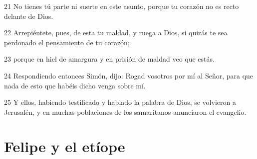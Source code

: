 \par 21 No tienes tú parte ni suerte en este asunto, porque tu corazón no es recto delante de Dios.
\par 22 Arrepiéntete, pues, de esta tu maldad, y ruega a Dios, si quizás te sea perdonado el pensamiento de tu corazón;
\par 23 porque en hiel de amargura y en prisión de maldad veo que estás.
\par 24 Respondiendo entonces Simón, dijo: Rogad vosotros por mí al Señor, para que nada de esto que habéis dicho venga sobre mí.
\par 25 Y ellos, habiendo testificado y hablado la palabra de Dios, se volvieron a Jerusalén, y en muchas poblaciones de los samaritanos anunciaron el evangelio.

\section*{Felipe y el etíope}

